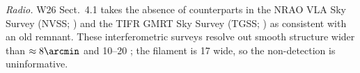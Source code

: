 \textit{Radio.} W26 Sect.~4.1 takes the absence of counterparts in the NRAO VLA Sky Survey (NVSS; \citealt{Condon1998}) and the TIFR GMRT Sky Survey (TGSS; \citealt{Intema2017}) as consistent with an old remnant. These interferometric surveys resolve out smooth structure wider than $\approx8\arcmin$ \citep[NVSS snapshots;][]{NRAO2025} and 10\arcmin--20\arcmin{} \citep[TGSS;][]{Intema2017}; the filament is 17\arcmin{} wide, so the non-detection is uninformative.
